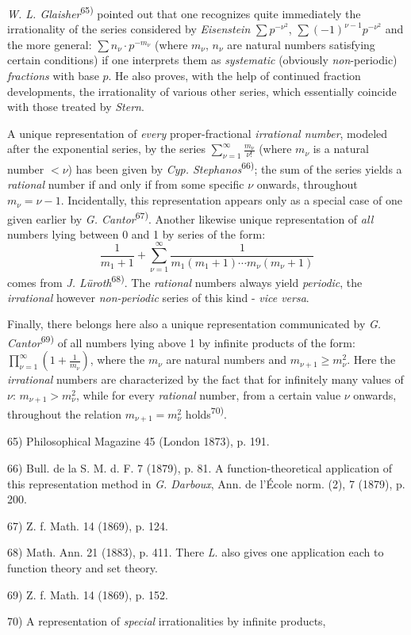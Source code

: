 \thispagestyle{fancy}

\vspace{0.5cm}

\textit{W. L. Glaisher}\textsuperscript{65)} pointed out that one recognizes quite immediately the irrationality of the series considered by \textit{Eisenstein} $\sum p^{-\nu^2}$, $\sum (-1)^{\nu-1}p^{-\nu^2}$ and the more general: $\sum n_\nu \cdot p^{-m_\nu}$ (where $m_\nu$, $n_\nu$ are natural numbers satisfying certain conditions) if one interprets them as \textit{systematic} (obviously \textit{non}-periodic) \textit{fractions} with base $p$. He also proves, with the help of continued fraction developments, the irrationality of various other series, which essentially coincide with those treated by \textit{Stern}.

A unique representation of \textit{every} proper-fractional \textit{irrational number}, modeled after the exponential series, by the series $\sum_{\nu=1}^{\infty} \frac{m_\nu}{\nu!}$ (where $m_\nu$ is a natural number $< \nu$) has been given by \textit{Cyp. Stephanos}\textsuperscript{66)}; the sum of the series yields a \textit{rational} number if and only if from some specific $\nu$ onwards, throughout $m_\nu = \nu-1$. Incidentally, this representation appears only as a special case of one given earlier by \textit{G. Cantor}\textsuperscript{67)}. Another likewise unique representation of \textit{all} numbers lying between 0 and 1 by series of the form:
$$\frac{1}{m_1 + 1} + \sum_{\nu=1}^{\infty} \frac{1}{m_1(m_1 + 1) \cdots m_\nu(m_\nu + 1)}$$
comes from \textit{J. Lüroth}\textsuperscript{68)}. The \textit{rational} numbers always yield \textit{periodic}, the \textit{irrational} however \textit{non-periodic} series of this kind - \textit{vice versa}.

Finally, there belongs here also a unique representation communicated by \textit{G. Cantor}\textsuperscript{69)} of all numbers lying above 1 by infinite products of the form: $\prod_{\nu=1}^{\infty}(1 + \frac{1}{m_\nu})$, where the $m_\nu$ are natural numbers and $m_{\nu+1} \geq m_\nu^2$. Here the \textit{irrational} numbers are characterized by the fact that for infinitely many values of $\nu$: $m_{\nu+1} > m_\nu^2$, while for every \textit{rational} number, from a certain value $\nu$ onwards, throughout the relation $m_{\nu+1} = m_\nu^2$ holds\textsuperscript{70)}.

\vfill
\leftline{\rule{2in}{0.4pt}}
\vspace{0.2cm}
{
\footnotesize
65) Philosophical Magazine 45 (London 1873), p. 191.

66) Bull. de la S. M. d. F. 7 (1879), p. 81. A function-theoretical application of this representation method in \textit{G. Darboux}, Ann. de l'École norm. (2), 7 (1879), p. 200.

67) Z. f. Math. 14 (1869), p. 124.

68) Math. Ann. 21 (1883), p. 411. There \textit{L}. also gives one application each to function theory and set theory.

69) Z. f. Math. 14 (1869), p. 152.

70) A representation of \textit{special} irrationalities by infinite products,

}